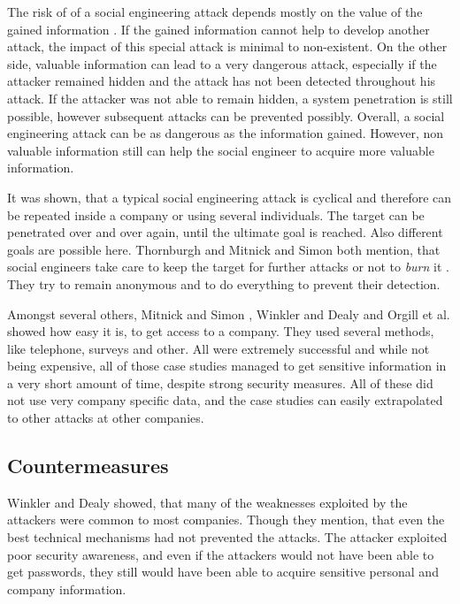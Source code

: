 The risk of of a social engineering attack depends mostly on the value of the
gained information \cite{thornburgh2004}. If the gained information cannot help
to develop another attack, the impact of this special attack is minimal to
non-existent. On the other side, valuable information can lead to a very
dangerous attack, especially if the attacker remained hidden and the attack has
not been detected throughout his attack. If the attacker was not able to remain
hidden, a system penetration is still possible, however subsequent attacks can
be prevented possibly. Overall, a social engineering attack can be as dangerous
as the information gained. However, non valuable information still can help the
social engineer to acquire more valuable information.

It was shown, that a typical social engineering attack is cyclical and
therefore can be repeated inside a company or using several individuals. The
target can be penetrated over and over again, until the ultimate goal is
reached. Also different goals are possible here. Thornburgh
\cite{thornburgh2004} and Mitnick and Simon \cite{mitnick2003} both mention,
that social engineers take care to keep the target for further attacks or not
to \textit{burn} it \cite{thornburgh2004}. They try to remain anonymous and to
do everything to prevent their detection.

Amongst several others, Mitnick and Simon \cite{mitnick2003}, Winkler and Dealy
\cite{winkler1995} and Orgill et al. \cite{orgill2004} showed how easy it is,
to get access to a company. They used several methods, like telephone, surveys
and other. All were extremely successful and while not being expensive, all of
those case studies managed to get sensitive information in a very short amount
of time, despite strong security measures. All of these did not use very
company specific data, and the case studies can easily extrapolated to other
attacks at other companies.

\subsection{Countermeasures}

Winkler and Dealy \cite{winkler1995} showed, that many of the weaknesses
exploited by the attackers were common to most companies. Though they mention,
that even the best technical mechanisms had not prevented the attacks. The
attacker exploited poor security awareness, and even if the attackers would not
have been able to get passwords, they still would have been able to acquire
sensitive personal and company information.

